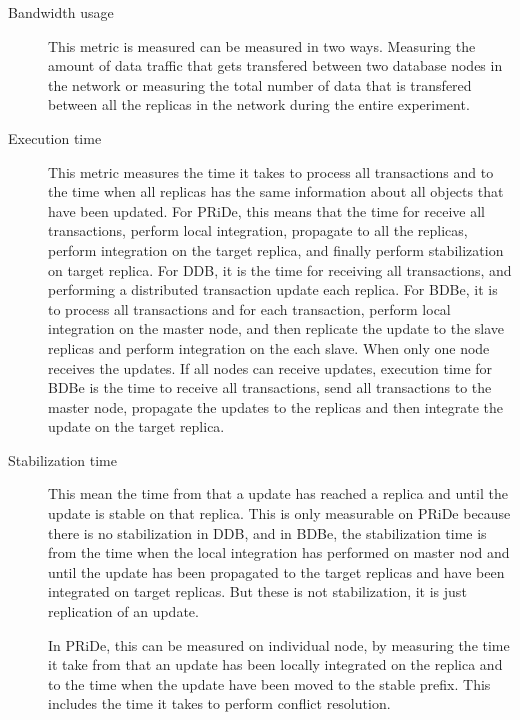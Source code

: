 \begin{description}
	
	\item[Bandwidth usage]

This metric is measured can be measured in two ways. Measuring the amount of data traffic that gets transfered between two database nodes in the network or measuring the total number of data that is transfered between all the replicas in the network during the entire experiment.

	\item[Execution time]
	
	This metric measures the time it takes to process all transactions and to the time when all replicas has the same information about all objects that have been updated. For PRiDe, this means that the time for receive all transactions, perform local integration, propagate to all the replicas, perform integration on the target replica, and finally perform stabilization on target replica. For DDB, it is the time for receiving all transactions, and performing a distributed transaction update each replica. For BDBe, it is to process all transactions and for each transaction, perform local integration on the master node, and then replicate the update to the slave replicas and perform integration on the each slave. When only one node receives the updates. If all nodes can receive updates, execution time for BDBe is the time to receive all transactions, send all transactions to the master node, propagate the updates to the replicas and then integrate the update on the target replica.
	 
	
	\item[Stabilization time]
	This mean the time from that a update has reached a replica and until the update is stable on that replica. This is only measurable on PRiDe because there is no stabilization in DDB, and in BDBe, the stabilization time is from the time when the local integration has performed on master nod and until the update has been propagated to the target replicas and have been integrated on target replicas. But these is not stabilization, it is just replication of an update.
	
	In PRiDe, this can be measured on individual node, by measuring the time it take from that an update has been locally integrated on the replica and to the time when the update have been moved to the stable prefix. This includes the time it takes to perform conflict resolution. 
	

\end{description}
